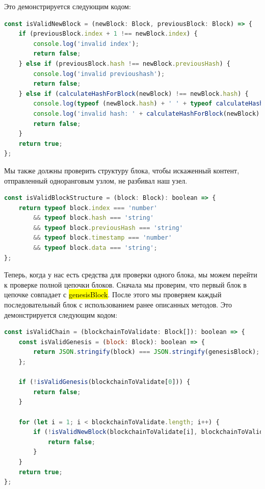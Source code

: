 \documentclass{article}
\begin{document}
Это демонстрируется следующим кодом:


\begin{lstlisting}[language=JavaScript, caption={Проверка целостности блоков}]
const isValidNewBlock = (newBlock: Block, previousBlock: Block) => {
	if (previousBlock.index + 1 !== newBlock.index) {
		console.log('invalid index');
		return false;
	} else if (previousBlock.hash !== newBlock.previousHash) {
		console.log('invalid previoushash');
		return false;
	} else if (calculateHashForBlock(newBlock) !== newBlock.hash) {
		console.log(typeof (newBlock.hash) + ' ' + typeof calculateHashForBlock(newBlock));
		console.log('invalid hash: ' + calculateHashForBlock(newBlock) + ' ' + newBlock.hash);
		return false;
	}
	return true;
};
\end{lstlisting}

Мы также должны проверить структуру блока, чтобы искаженный контент, отправленный одноранговым узлом, не разбивал наш узел.

\begin{lstlisting}[language=JavaScript, caption={Проверка полей структуры блока}]
const isValidBlockStructure = (block: Block): boolean => {
	return typeof block.index === 'number'
		&& typeof block.hash === 'string'
		&& typeof block.previousHash === 'string'
		&& typeof block.timestamp === 'number'
		&& typeof block.data === 'string';
};
\end{lstlisting}

Теперь, когда у нас есть средства для проверки одного блока, мы можем перейти к проверке полной цепочки блоков. Сначала мы проверим, что первый блок в цепочке совпадает с \hl{genesisBlock}. После этого мы проверяем каждый последовательный блок с использованием ранее описанных методов. Это демонстрируется следующим кодом:

\begin{lstlisting}[language=JavaScript, caption={Проверка полей структуры блока}]
const isValidChain = (blockchainToValidate: Block[]): boolean => {
	const isValidGenesis = (block: Block): boolean => {
		return JSON.stringify(block) === JSON.stringify(genesisBlock);
	};
	
	if (!isValidGenesis(blockchainToValidate[0])) {
		return false;
	}
	
	for (let i = 1; i < blockchainToValidate.length; i++) {
		if (!isValidNewBlock(blockchainToValidate[i], blockchainToValidate[i - 1])) {
			return false;
		}
	}
	return true;
};
\end{lstlisting}
\end{document}
